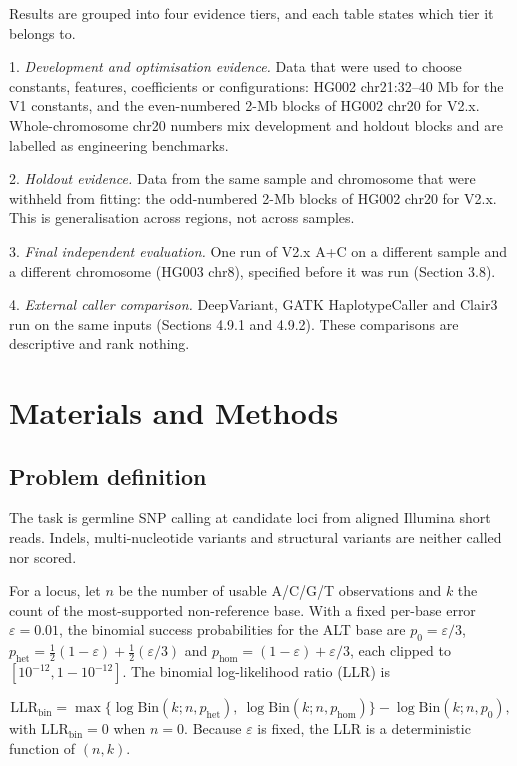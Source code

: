 \documentclass[11pt,a4paper]{article}
\makeatletter
\newcommand{\needspace}[1]{\par\ifdim\pagegoal=\maxdimen\else\dimen@=\pagegoal\advance\dimen@-\pagetotal\ifdim\dimen@<#1\relax\newpage\fi\fi}
\makeatother
\begin{document}
Results are grouped into four evidence tiers, and each table states which tier it belongs to.

1. \emph{Development and optimisation evidence.} Data that were used to choose constants, features, coefficients or configurations: HG002 chr21:32--40 Mb for the V1 constants, and the even-numbered 2-Mb blocks of HG002 chr20 for V2.x. Whole-chromosome chr20 numbers mix development and holdout blocks and are labelled as engineering benchmarks.

2. \emph{Holdout evidence.} Data from the same sample and chromosome that were withheld from fitting: the odd-numbered 2-Mb blocks of HG002 chr20 for V2.x. This is generalisation across regions, not across samples.

3. \emph{Final independent evaluation.} One run of V2.x A+C on a different sample and a different chromosome (HG003 chr8), specified before it was run (Section 3.8).

4. \emph{External caller comparison.} DeepVariant, GATK HaplotypeCaller and Clair3 run on the same inputs (Sections 4.9.1 and 4.9.2). These comparisons are descriptive and rank nothing.

\FloatBarrier
\needspace{10\baselineskip}
\section{\texorpdfstring{Materials and Methods}{Materials and Methods}}
\needspace{6\baselineskip}
\subsection{\texorpdfstring{Problem definition}{Problem definition}}
The task is germline SNP calling at candidate loci from aligned Illumina short reads. Indels, multi-nucleotide variants and structural variants are neither called nor scored.

For a locus, let $n$ be the number of usable A/C/G/T observations and $k$ the count of the most-supported non-reference base. With a fixed per-base error $\varepsilon = 0.01$, the binomial success probabilities for the ALT base are $p_0 = \varepsilon/3$, $p_{\mathrm{het}} = \tfrac12(1-\varepsilon) + \tfrac12(\varepsilon/3)$ and $p_{\mathrm{hom}} = (1-\varepsilon) + \varepsilon/3$, each clipped to $[10^{-12}, 1-10^{-12}]$. The binomial log-likelihood ratio (LLR) is

\[
\mathrm{LLR}_{\mathrm{bin}} = \max\{\log \mathrm{Bin}(k;n,p_{\mathrm{het}}),\ \log \mathrm{Bin}(k;n,p_{\mathrm{hom}})\} - \log \mathrm{Bin}(k;n,p_0),
\]
with $\mathrm{LLR}_{\mathrm{bin}}=0$ when $n=0$. Because $\varepsilon$ is fixed, the LLR is a deterministic function of $(n,k)$.
\end{document}

